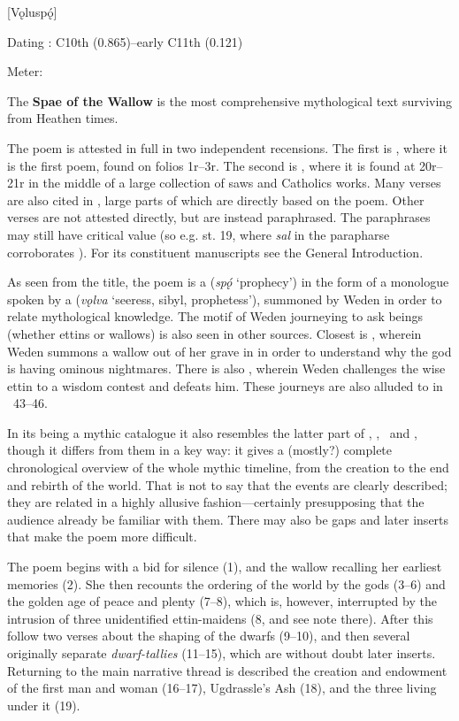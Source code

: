 [Vǫluspǫ́]

\begin{flushright}%
Dating \parencite{Sapp2022}: C10th (0.865)–early C11th (0.121)

Meter: \Fornyrdislag%
\end{flushright}

The \textbf{Spae of the Wallow} is the most comprehensive mythological text surviving from Heathen times.

The poem is attested in full in two independent recensions. The first is \Regius, where it is the first poem, found on folios 1r–3r. The second is \Hauksbok, where it is found at 20r–21r in the middle of a large collection of saws and Catholics works. Many verses are also cited in \Gylfaginning, large parts of which are directly based on the poem. Other verses are not attested directly, but are instead paraphrased. The paraphrases may still have critical value (so e.g. st. 19, where \emph{sal} in the parapharse corroborates \Hauksbok). For its constituent manuscripts see the General Introduction. %

As seen from the title, the poem is a  (\emph{spǫ́} ‘prophecy’) in the form of a monologue spoken by a  (\emph{vǫlva} ‘seeress, sibyl, prophetess’), summoned by Weden in order to relate mythological knowledge. The motif of Weden journeying to ask beings (whether ettins or wallows) is also seen in other sources. Closest is \Baldrsdraumar, wherein Weden summons a wallow out of her grave in  in order to understand why the god  is having ominous nightmares. There is also \Vafthrudnismal, wherein Weden challenges the wise ettin  to a wisdom contest and defeats him. These journeys are also alluded to in \Harbardsljod\ 43–46.

In its being a mythic catalogue it also resembles the latter part of \Havamal, \Grimnismal, \Sigrdrifumal\ and \Allvismal, though it differs from them in a key way: it gives a (mostly?) complete chronological overview of the whole mythic timeline, from the creation to the end and rebirth of the world. That is not to say that the events are clearly described; they are related in a highly allusive fashion—certainly presupposing that the audience already be familiar with them. There may also be gaps and later inserts that make the poem more difficult.

\sectionline

The poem begins with a bid for silence (1), and the wallow recalling her earliest memories (2). She then recounts the ordering of the world by the gods (3–6) and the golden age of peace and plenty (7–8), which is, however, interrupted by the intrusion of three unidentified ettin-maidens (8, and see note there). After this follow two verses about the shaping of the dwarfs (9–10), and then several originally separate \emph{dwarf-tallies} (11–15), which are without doubt later inserts. Returning to the main narrative thread is described the creation and endowment of the first man and woman (16–17), Ugdrassle’s Ash (18), and the three  living under it (19).

